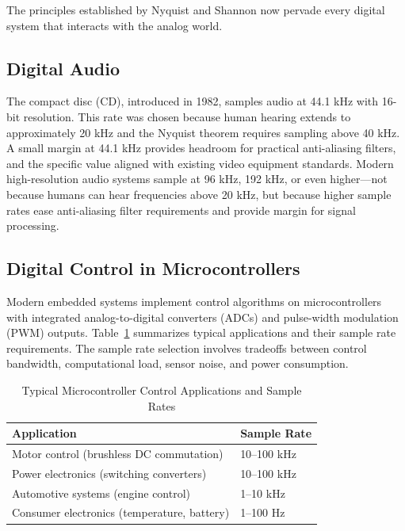 The principles established by Nyquist and Shannon now pervade every digital system that interacts with the analog world.

\subsection{Digital Audio}
\label{subsec:digital_audio}

The compact disc (CD), introduced in 1982, samples audio at 44.1 kHz with 16-bit resolution. This rate was chosen because human hearing extends to approximately 20 kHz and the Nyquist theorem requires sampling above 40 kHz. A small margin at 44.1 kHz provides headroom for practical anti-aliasing filters, and the specific value aligned with existing video equipment standards. Modern high-resolution audio systems sample at 96 kHz, 192 kHz, or even higher---not because humans can hear frequencies above 20 kHz, but because higher sample rates ease anti-aliasing filter requirements and provide margin for signal processing.

\subsection{Digital Control in Microcontrollers}
\label{subsec:microcontroller_control}

Modern embedded systems implement control algorithms on microcontrollers with integrated analog-to-digital converters (ADCs) and pulse-width modulation (PWM) outputs. Table~\ref{tab:microcontroller_applications} summarizes typical applications and their sample rate requirements. The sample rate selection involves tradeoffs between control bandwidth, computational load, sensor noise, and power consumption.

\begin{table}[htbp]
\centering
\caption{Typical Microcontroller Control Applications and Sample Rates}
\label{tab:microcontroller_applications}
\begin{tabular}{ll}
\toprule
\textbf{Application} & \textbf{Sample Rate} \\
\midrule
Motor control (brushless DC commutation) & 10--100 kHz \\
Power electronics (switching converters) & 10--100 kHz \\
Automotive systems (engine control) & 1--10 kHz \\
Consumer electronics (temperature, battery) & 1--100 Hz \\
\bottomrule
\end{tabular}
\end{table}

